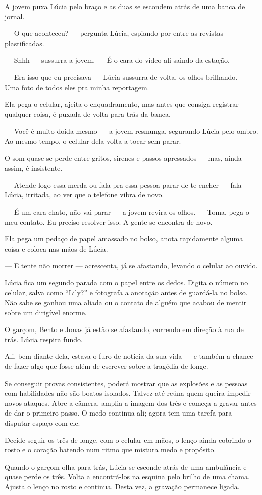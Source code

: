 A jovem puxa Lúcia pelo braço e as duas se escondem atrás de uma banca de jornal.

— O que aconteceu? — pergunta Lúcia, espiando por entre as revistas plastificadas.

— Shhh — sussurra a jovem. — É o cara do vídeo ali saindo da estação.

— Era isso que eu precisava — Lúcia sussurra de volta, os olhos brilhando. — Uma foto de todos eles pra minha reportagem.

Ela pega o celular, ajeita o enquadramento, mas antes que consiga registrar qualquer coisa, é puxada de volta para trás da banca.

— Você é muito doida mesmo — a jovem resmunga, segurando Lúcia pelo ombro. Ao mesmo tempo, o celular dela volta a tocar sem parar.

O som quase se perde entre gritos, sirenes e passos apressados — mas, ainda assim, é insistente.

— Atende logo essa merda ou fala pra essa pessoa parar de te encher — fala Lúcia, irritada, ao ver que o telefone vibra de novo.

— É um cara chato, não vai parar — a jovem revira os olhos. — Toma, pega o meu contato. Eu preciso resolver isso. A gente se encontra de novo.

Ela pega um pedaço de papel amassado no bolso, anota rapidamente alguma coisa e coloca nas mãos de Lúcia.

— E tente não morrer — acrescenta, já se afastando, levando o celular ao ouvido.

Lúcia fica um segundo parada com o papel entre os dedos. Digita o número no celular, salva como “Lily?” e fotografa a anotação antes de guardá-la no bolso. Não sabe se ganhou uma aliada ou o contato de alguém que acabou de mentir sobre um dirigível enorme.

O garçom, Bento e Jonas já estão se afastando, correndo em direção à rua de trás.  
Lúcia respira fundo.

Ali, bem diante dela, estava o furo de notícia da sua vida — e também a chance de fazer algo que fosse além de escrever sobre a tragédia de longe.

Se conseguir provas consistentes, poderá mostrar que as explosões e as pessoas com habilidades não são boatos isolados. Talvez até reúna quem queira impedir novos ataques. Abre a câmera, amplia a imagem dos três e começa a gravar antes de dar o primeiro passo. O medo continua ali; agora tem uma tarefa para disputar espaço com ele.

Decide seguir os três de longe, com o celular em mãos, o lenço ainda cobrindo o rosto e o coração batendo num ritmo que mistura medo e propósito.

Quando o garçom olha para trás, Lúcia se esconde atrás de uma ambulância e quase perde os três. Volta a encontrá-los na esquina pelo brilho de uma chama. Ajusta o lenço no rosto e continua. Desta vez, a gravação permanece ligada.
